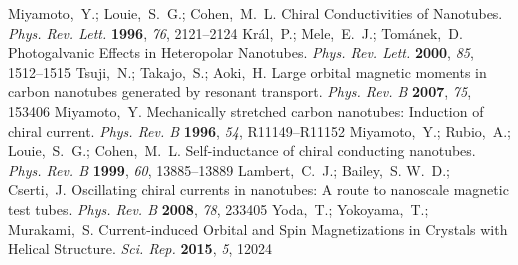 \documentclass[journal=nalefd,manuscript=article,layout=twocolumn]{achemso}
\begin{document}
\begin{mcitethebibliography}{48}
Miyamoto,~Y.; Louie,~S.~G.; Cohen,~M.~L. Chiral Conductivities of Nanotubes.
  \emph{Phys. Rev. Lett.} \textbf{1996}, \emph{76}, 2121--2124\relax
\mciteBstWouldAddEndPuncttrue
\mciteSetBstMidEndSepPunct{\mcitedefaultmidpunct}
{\mcitedefaultendpunct}{\mcitedefaultseppunct}\relax
\EndOfBibitem
{}
Kr\'al,~P.; Mele,~E.~J.; Tom\'anek,~D. Photogalvanic Effects in Heteropolar
  Nanotubes. \emph{Phys. Rev. Lett.} \textbf{2000}, \emph{85}, 1512--1515\relax
\mciteBstWouldAddEndPuncttrue
\mciteSetBstMidEndSepPunct{\mcitedefaultmidpunct}
{\mcitedefaultendpunct}{\mcitedefaultseppunct}\relax
\EndOfBibitem
{}
Tsuji,~N.; Takajo,~S.; Aoki,~H. Large orbital magnetic moments in carbon
  nanotubes generated by resonant transport. \emph{Phys. Rev. B} \textbf{2007},
  \emph{75}, 153406\relax
\mciteBstWouldAddEndPuncttrue
\mciteSetBstMidEndSepPunct{\mcitedefaultmidpunct}
{\mcitedefaultendpunct}{\mcitedefaultseppunct}\relax
\EndOfBibitem
{}
Miyamoto,~Y. Mechanically stretched carbon nanotubes: Induction of chiral
  current. \emph{Phys. Rev. B} \textbf{1996}, \emph{54}, R11149--R11152\relax
\mciteBstWouldAddEndPuncttrue
\mciteSetBstMidEndSepPunct{\mcitedefaultmidpunct}
{\mcitedefaultendpunct}{\mcitedefaultseppunct}\relax
\EndOfBibitem
{}
Miyamoto,~Y.; Rubio,~A.; Louie,~S.~G.; Cohen,~M.~L. Self-inductance of chiral
  conducting nanotubes. \emph{Phys. Rev. B} \textbf{1999}, \emph{60},
  13885--13889\relax
\mciteBstWouldAddEndPuncttrue
\mciteSetBstMidEndSepPunct{\mcitedefaultmidpunct}
{\mcitedefaultendpunct}{\mcitedefaultseppunct}\relax
\EndOfBibitem
{}
Lambert,~C.~J.; Bailey,~S. W.~D.; Cserti,~J. Oscillating chiral currents in
  nanotubes: A route to nanoscale magnetic test tubes. \emph{Phys. Rev. B}
  \textbf{2008}, \emph{78}, 233405\relax
\mciteBstWouldAddEndPuncttrue
\mciteSetBstMidEndSepPunct{\mcitedefaultmidpunct}
{\mcitedefaultendpunct}{\mcitedefaultseppunct}\relax
\EndOfBibitem
{}
Yoda,~T.; Yokoyama,~T.; Murakami,~S. Current-induced Orbital and Spin
  Magnetizations in Crystals with Helical Structure. \emph{Sci. Rep.}
  \textbf{2015}, \emph{5}, 12024\relax
\mciteBstWouldAddEndPuncttrue
\mciteSetBstMidEndSepPunct{\mcitedefaultmidpunct}
{\mcitedefaultendpunct}{\mcitedefaultseppunct}\relax

\end{mcitethebibliography}
\end{document}
